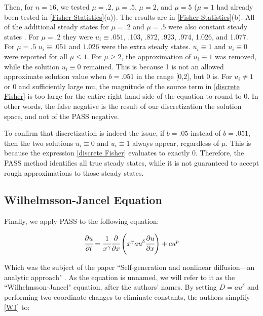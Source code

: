 \documentclass[11pt]{article}
\begin{document}
Then, for $n = 16$, we tested $\mu = .2$, $\mu = .5$, $\mu = 2$, and $\mu = 5$ ($\mu = 1$ had already been tested in \cref{Fisher Statistics}(a)). The results are in \cref{Fisher Statistics}(b). All of the additional steady states for $\mu = .2$ and $\mu = .5$ were also constant steady states . For $\mu = .2$ they were $u_i \equiv .051$, .103, .872, .923, .974, 1.026, and 1.077. For $\mu = .5$ $u_i \equiv .051$ and $1.026$ were the extra steady states. $u_i \equiv 1$ and $u_i \equiv 0$ were reported for all $\mu \le 1$. For $\mu \ge 2$, the approximation of $u_i \equiv 1$ was removed, while the solution $u_i \equiv 0$ remained. This is because 1 is not an allowed approximate solution value when $b = .051$ in the range [0,2], but 0 is. For $u_i \ne 1$ or $0$ and sufficiently large mu, the magnitude of the source term in \cref{discrete Fisher} is too large for the entire right hand side of the equation to round to 0. In other words, the false negative is the result of our discretization the solution space, and not of the PASS negative.

To confirm that discretization is indeed the issue, if $b = .05$ instead of $b = .051$, then the two solutions $u_i \equiv 0$ and $u_i \equiv 1$ always appear, regardless of $\mu$. This is because the expression \eqref{discrete Fisher} evaluates to exactly 0. Therefore, the PASS method identifies all true steady states, while it is not guaranteed to accept rough approximations to those steady states.

\subsection{Wilhelmsson-Jancel Equation}\label{sec:WJ}

Finally, we apply PASS to the following equation:

\begin{equation}
    \label{WJ}
    \cfrac{\partial{u}}{\partial{t}} = \cfrac{1}{x^\gamma} \cfrac{\partial}{\partial{x}} \left( x^\gamma au^\delta \cfrac{\partial{u}}{\partial{x}} \right) + cu^p
\end{equation}

Which was the subject of the paper ``Self-generation and nonlinear diffusion---an analytic approach" \citep{WJ}. As the equation is unnamed, we will refer to it as the ``Wilhelmsson-Jancel" equation, after the authors' names. By setting $D = au^\delta$ and performing two coordinate changes to eliminate constants, the authors simplify \cref{WJ} to:
\end{document}
